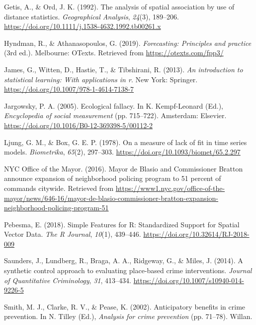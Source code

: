 \documentclass[
  english,
  man,a4paper,mask,floatsintext]{apa6}
\begin{document}
\leavevmode\hypertarget{ref-Getis:1992hw}{}%
Getis, A., \& Ord, J. K. (1992). The analysis of spatial association by use of distance statistics. \emph{Geographical Analysis}, \emph{24}(3), 189--206. \url{https://doi.org/10.1111/j.1538-4632.1992.tb00261.x}

\leavevmode\hypertarget{ref-Hyndman:2019aa}{}%
Hyndman, R., \& Athanasopoulos, G. (2019). \emph{Forecasting: Principles and practice} (3rd ed.). Melbourne: OTexts. Retrieved from \url{https://otexts.com/fpp3/}

\leavevmode\hypertarget{ref-James:2013aa}{}%
James, G., Witten, D., Hastie, T., \& Tibshirani, R. (2013). \emph{An introduction to statistical learning: With applications in r}. New York: Springer. \url{https://doi.org/10.1007/978-1-4614-7138-7}

\leavevmode\hypertarget{ref-Jargowsky:2005aa}{}%
Jargowsky, P. A. (2005). Ecological fallacy. In K. Kempf-Leonard (Ed.), \emph{Encyclopedia of social measurement} (pp. 715--722). Amsterdam: Elsevier. \url{https://doi.org/10.1016/B0-12-369398-5/00112-2}

\leavevmode\hypertarget{ref-Ljung:1978aa}{}%
Ljung, G. M., \& Box, G. E. P. (1978). On a measure of lack of fit in time series models. \emph{Biometrika}, \emph{65}(2), 297--303. \url{https://doi.org/10.1093/biomet/65.2.297}

\leavevmode\hypertarget{ref-NYC-Office-of-the-Mayor:2016aa}{}%
NYC Office of the Mayor. (2016). Mayor de Blasio and Commissioner Bratton announce expansion of neighborhood policing program to 51 percent of commands citywide. Retrieved from \url{https://www1.nyc.gov/office-of-the-mayor/news/646-16/mayor-de-blasio-commissioner-bratton-expansion-neighborhood-policing-program-51}

\leavevmode\hypertarget{ref-Pebesma:2018aa}{}%
Pebesma, E. (2018). Simple Features for R: Standardized Support for Spatial Vector Data. \emph{The R Journal}, \emph{10}(1), 439--446. \url{https://doi.org/10.32614/RJ-2018-009}

\leavevmode\hypertarget{ref-Saunders:2014aa}{}%
Saunders, J., Lundberg, R., Braga, A. A., Ridgeway, G., \& Miles, J. (2014). A synthetic control approach to evaluating place-based crime interventions. \emph{Journal of Quantitative Criminology}, \emph{31}, 413--434. \url{https://doi.org/10.1007/s10940-014-9226-5}

\leavevmode\hypertarget{ref-Smith:2002aa}{}%
Smith, M. J., Clarke, R. V., \& Pease, K. (2002). Anticipatory benefits in crime prevention. In N. Tilley (Ed.), \emph{Analysis for crime prevention} (pp. 71--78). Willan.
\end{document}
